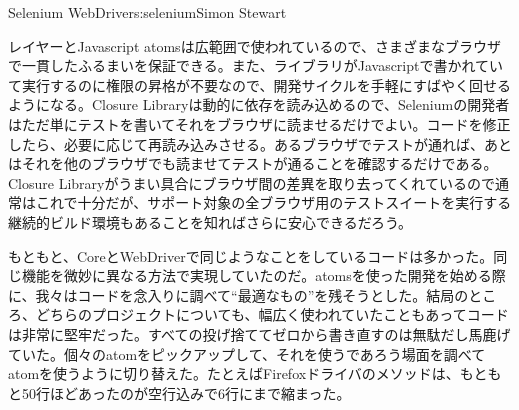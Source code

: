 \begin{aosachapter}{Selenium WebDriver}{s:selenium}{Simon Stewart}
\begin{aosasect1}{レイヤーとJavascript}
atomsは広範囲で使われているので、さまざまなブラウザで一貫したふるまいを保証できる。また、ライブラリがJavascriptで書かれていて実行するのに権限の昇格が不要なので、開発サイクルを手軽にすばやく回せるようになる。Closure Libraryは動的に依存を読み込めるので、Seleniumの開発者はただ単にテストを書いてそれをブラウザに読ませるだけでよい。コードを修正したら、必要に応じて再読み込みさせる。あるブラウザでテストが通れば、あとはそれを他のブラウザでも読ませてテストが通ることを確認するだけである。Closure Libraryがうまい具合にブラウザ間の差異を取り去ってくれているので通常はこれで十分だが、サポート対象の全ブラウザ用のテストスイートを実行する継続的ビルド環境もあることを知ればさらに安心できるだろう。

もともと、CoreとWebDriverで同じようなことをしているコードは多かった。同じ機能を微妙に異なる方法で実現していたのだ。atomsを使った開発を始める際に、我々はコードを念入りに調べて``最適なもの''を残そうとした。結局のところ、どちらのプロジェクトについても、幅広く使われていたこともあってコードは非常に堅牢だった。すべての投げ捨ててゼロから書き直すのは無駄だし馬鹿げていた。個々のatomをピックアップして、それを使うであろう場面を調べてatomを使うように切り替えた。たとえばFirefoxドライバのメソッドは、もともと50行ほどあったのが空行込みで6行にまで縮まった。


\end{aosasect1}
\end{aosachapter}
